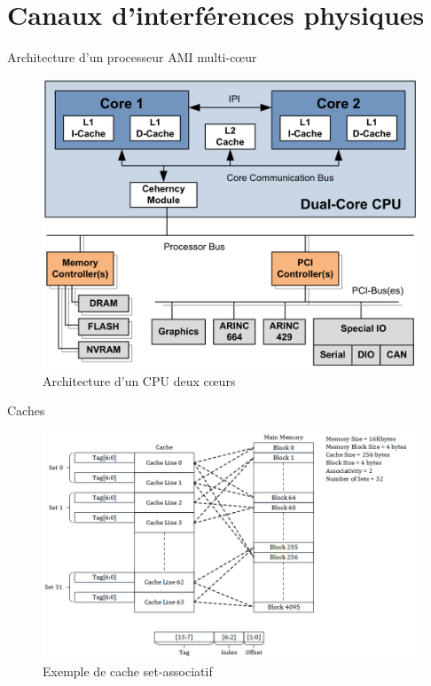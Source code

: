 \documentclass{beamer}
\begin{document}
\section[CI physiques]{Canaux d'interférences physiques}

\begin{frame}{Architecture d'un processeur AMI multi-cœur}
	\begin{figure}
		\centering
		\includegraphics[width=0.7\linewidth]{arch.png}
		\caption{Architecture d'un CPU deux cœurs \cite{Fuch}}
		\label{fig:arch}
	\end{figure}	
\end{frame}

\begin{frame}{Caches}

			\begin{figure}
				\centering
				\includegraphics[width=\linewidth]{Set-Associative_Cache_Snehal_Img.png}
				\caption{Exemple de cache set-associatif \cite{wiki:Cache_placement_policies}}
				\label{fig:Set-Asso}
			\end{figure}
\end{frame}
\end{document}
